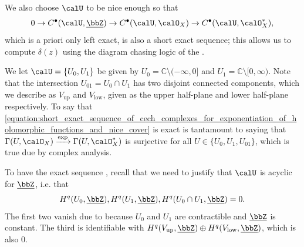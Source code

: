 \begin{example}
    We also choose $\calU$ to be nice enough so that 
    \begin{equation} \label{equation:short_exact_sequence_of_cech_complexes_for_exponentiation_of_holomorphic_functions_and_nice_cover}
    0 \to C^\bullet(\calU, \underline{\bbZ}) \to C^\bullet(\calU, \calO_X) \to C^\bullet(\calU, \calO_X^*),
    \end{equation}
    which is a priori only left exact, is also a short exact sequence; this allows us to compute $\delta(z)$ using the diagram chasing logic of the . 

    We let $\calU = \{U_0, U_1\}$ be given by $U_0 = \mathbb{C} \setminus (-\infty, 0]$ and $U_1 = \mathbb{C} \setminus [0,\infty)$. Note that the intersection $U_{01} = U_0 \cap U_1$ has two disjoint connected components, which we describe as $V_{\text{up}}$ and $V_{\text{low}}$, given as the upper half-plane and lower half-plane respectively. To say that \eqref{equation:short_exact_sequence_of_cech_complexes_for_exponentiation_of_holomorphic_functions_and_nice_cover} is exact is tantamount to saying that $\Gamma(U, \calO_X) \xrightarrow{\exp} \Gamma(U, \calO_X^*)$ is surjective for all $U \in \{U_0, U_1, U_{01}\}$, which is true due by complex analysis. 
    
    To have the exact sequence , recall that we need to justify that $\calU$ is acyclic for $\underline{\bbZ}$, i.e. that 
    $$H^q(U_0, \underline{\bbZ}), H^q(U_1, \underline{\bbZ}), H^q(U_0 \cap U_1, \underline{\bbZ}) = 0.$$
    The first two vanish due to  because $U_0$ and $U_1$ are contractible and $\underline{\bbZ}$ is constant. The third is identifiable with $H^q(V_{\text{up}}, \underline{\bbZ}) \oplus H^q(V_{\text{low}}, \underline{\bbZ})$, which is also $0$.
    

\end{example}
